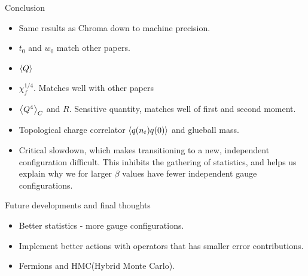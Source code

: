 \documentclass[10pt,show notes on second screen]{beamer}
\begin{document}
\begin{frame}{Conclusion}
{\begin{itemize}
    \item <2->Same results as Chroma down to machine precision.
    \item <3->$t_0$ and $w_0$ match other papers.
    \item <4->$\left\langle{Q}\right\rangle$
    \item <5->$\chi^{1/4}_f$. Matches well with other papers
    \item <6->$\left\langle{Q^4}\right\rangle_C$ and $R$. Sensitive quantity, matches well of first and second moment.
    \item <7->Topological charge correlator $\left\langle{q(n_t)q(0)}\right\rangle$ and glueball mass.
    \item <8->Critical slowdown, which makes transitioning to a new, independent configuration difficult. This inhibits the gathering of statistics, and helps us explain why we for larger $\beta$ values have fewer independent gauge configurations.
\end{itemize}
}
\end{frame}

\begin{frame}{Future developments and final thoughts}
\begin{itemize}[<+->]
    \item Better statistics - more gauge configurations.
    \item Implement better actions with operators that has smaller error contributions.
    \item Fermions and HMC(Hybrid Monte Carlo).
\end{itemize}
\end{frame}


\end{document}
